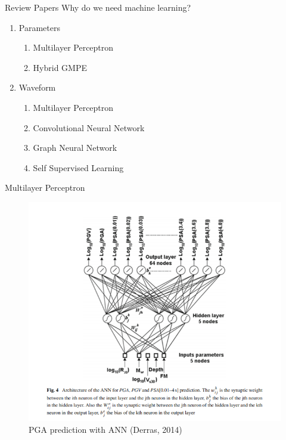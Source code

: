 \documentclass{beamer}
\begin{document}
	\begin{frame}[t]{Review Papers}
		Why do we need machine learning?\\
		
		\vspace{10pt}
		\begin{enumerate}
			\item Parameters
			\begin{enumerate}
				\item Multilayer Perceptron
				\item Hybrid GMPE

			\end{enumerate}
			\vspace{10pt}
			\item Waveform
			\begin{enumerate}
				\item Multilayer Perceptron
				\item Convolutional Neural Network
				\item Graph Neural Network
				\item Self Supervised Learning
			\end{enumerate}
		\end{enumerate}
	\end{frame}
	


	\begin{frame}[t]{Multilayer Perceptron}
		\begin{figure}
			\includegraphics[scale=0.4]{mlp.png}
			\caption{PGA prediction with ANN (Derras, 2014)}
		\end{figure}
		
	\end{frame}
	
\end{document}
